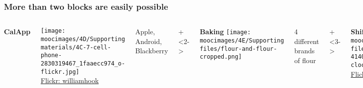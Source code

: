 \documentclass[handout,11pt,aspectratio=169,mathserif]{beamer}
\begin{document}
\begin{frame}\frametitle{More than two blocks are easily possible}
	
	\begin{columns}[t]
			\textbf{CalApp}
			
			\texttt{[image: \\moocimages/4D/Supporting materials/4C-7-cell-phone-2830319467\_1faaecc974\_o-flickr.jpg]}
			\\
			{\tiny{\href{https://secure.flickr.com/photos/williamhook/2830319467/}{Flickr: williamhook}}}
			
			\vspace{1cm}
			Apple, Android, Blackberry
		
		
			\onslide+<2->{
				\textbf{Baking}
				\texttt{[image: \\moocimages/4E/Supporting files/flour-and-flour-cropped.png]}
		
				\vspace{1.1cm}
				4 different brands of flour
			}
			
			\onslide+<3->{
				\textbf{Shift work}
				\texttt{[image: \\moocimages/4E/Supporting files/flickr-4140348113\_f0efc8235b\_z-clock.jpg]}
				\\
				{\tiny{\href{https://secure.flickr.com/photos/leehaywood/4140348113}{Flickr: leehaywood}}}
				
				
				
				\vspace{0.8cm}
				Day shift\\
				Afternoon shift\\
				Night shift
			}
		
			\onslide+<4->{
				\textbf{Gas mileage}
				
				\texttt{[image: \\moocimages/4D/Supporting materials/4C-6-gas-mileage.png]}
				
				\vspace{1.65cm}
				Gasoline brand 1\\
				Gasoline brand 2\\
				Gasoline brand 3\\
			}
			
	\end{columns}
	
	
\end{frame}
\end{document}
